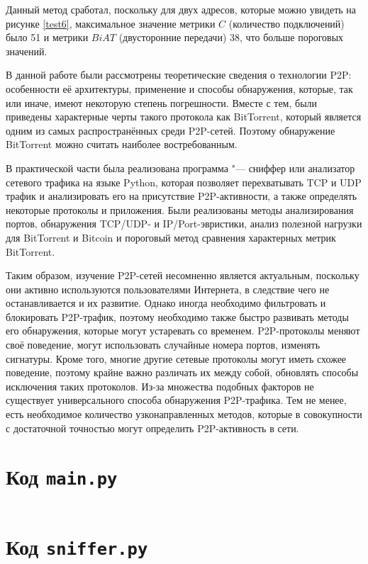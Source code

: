 \documentclass[bachelor, och, coursework]{SCWorks}
\begin{document}
Данный метод сработал, поскольку для двух адресов, которые можно увидеть на рисунке \ref{test6}, максимальное значение метрики $C$ (количество подключений) было 51 и метрики $BiAT$ (двусторонние передачи) 38, что больше пороговых значений.

\conclusion
В данной работе были рассмотрены теоретические сведения о технологии P2P: особенности её архитектуры, применение
и способы обнаружения, которые, так или иначе, имеют некоторую степень погрешности. Вместе с тем, были приведены характерные черты такого протокола как BitTorrent, который является одним из самых распространённых среди P2P-сетей.
Поэтому обнаружение BitTorrent можно считать наиболее востребованным.

В практической части была реализована программа "--- сниффер или анализатор сетевого трафика на языке Python, которая позволяет
перехватывать TCP и UDP трафик и анализировать его на присутствие P2P-активности, а также определять некоторые протоколы и приложения. Были реализованы методы анализирования портов, обнаружения TCP/UDP- и IP/Port-эвристики, анализ полезной нагрузки для BitTorrent и Bitcoin и пороговый метод сравнения характерных метрик BitTorrent.

Таким образом, изучение P2P-сетей несомненно является актуальным, поскольку они активно используются пользователями Интернета, в следствие чего не останавливается и их развитие. Однако иногда необходимо фильтровать и блокировать P2P-трафик, поэтому необходимо также быстро развивать методы его обнаружения, которые могут устаревать со временем. P2P-протоколы меняют своё поведение, могут использовать случайные номера портов, изменять сигнатуры. Кроме того, многие другие сетевые протоколы могут иметь схожее поведение, поэтому крайне важно различать их между собой, обновлять способы исключения таких протоколов. Из-за множества подобных факторов не существует универсального способа обнаружения P2P-трафика. Тем не менее, есть необходимое количество узконаправленных методов, которые в совокупности с достаточной 
точностью могут определить P2P-активность в сети.




\appendix

    \section{Код \texttt{main.py}}
    \inputminted{py}{code/sniffer/main.py}

    \section{Код \texttt{sniffer.py}}
    \inputminted{py}{code/sniffer/sniffer.py}
\end{document}
